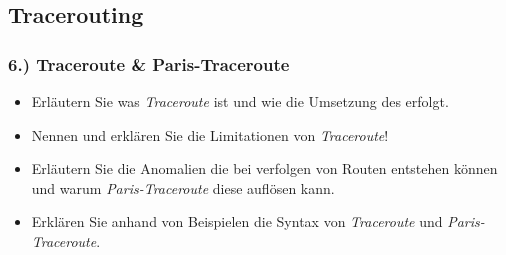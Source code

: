 \documentclass[xcolor=dvipsnames, aspectratio=169]{beamer}
\begin{document}
\subsection{Tracerouting}
\begin{frame}
\frametitle{6.) Traceroute \& Paris-Traceroute}
	\begin{itemize}
		\item Erläutern Sie was \emph{Traceroute} ist und wie die Umsetzung des erfolgt.
		\item Nennen und erklären Sie die Limitationen von \emph{Traceroute}!
		\item Erläutern Sie die Anomalien die bei verfolgen von Routen entstehen können und warum \emph{Paris-Traceroute} diese auflösen kann.
		\item Erklären Sie anhand von Beispielen die Syntax von \emph{Traceroute} und \emph{Paris-Traceroute}.
	\end{itemize}
\end{frame}
\end{document}
